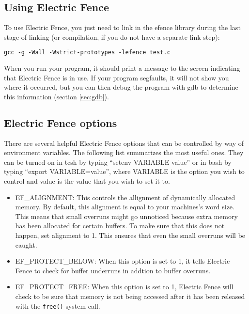 \documentclass[11pt, letterpaper]{article}
\begin{document}
\subsection{Using Electric Fence}

To use Electric Fence, you just need to link in the efence library
during the last stage of linking (or compilation, if you do not have a
separate link step):

\begin{verbatim}
gcc -g -Wall -Wstrict-prototypes -lefence test.c
\end{verbatim}

When you run your program, it should print a message to the screen
indicating that Electric Fence is in use.  If your program segfaults, it
will not show you where it occurred, but you can then debug the program with
gdb to determine this information (section \ref{sec:gdb}).

\subsection{Electric Fence options}

There are several helpful Electric Fence options that can be controlled
by way of environment variables.  The following list summarizes the most
useful ones.  They can be turned on in tcsh by typing ``setenv VARIABLE
value'' or in bash by typing ``export VARIABLE=value'', where VARIABLE is
the option you wish to control and value is the value that you wish to
set it to.

\begin{itemize}
	\item EF\_ALIGNMENT:  This controls the allignment of dynamically
	allocated memory.  By default, this alignment is equal to your
	machines's word size.  This means that small overruns might go
	unnoticed because extra memory has been allocated for certain
	buffers.  To make sure that this does not happen, set alignment to 1.
	This ensures that even the small overruns will be caught.
	\item EF\_PROTECT\_BELOW:  When this option is set to 1, it tells
	Electric Fence to check for buffer underruns in addtion to buffer
	overruns.
	\item EF\_PROTECT\_FREE:  When this option is set to 1, Electric
	Fence will check to be sure that memory is not being accessed after
	it has been released with the {\tt free()} system call.
\end{itemize}
\end{document}
